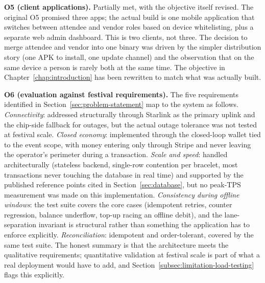 \textbf{O5 (client applications).} Partially met, with the objective itself revised. The original O5 promised three apps; the actual build is one mobile application that switches between attendee and vendor roles based on device whitelisting, plus a separate web admin dashboard. This is two clients, not three. The decision to merge attendee and vendor into one binary was driven by the simpler distribution story (one APK to install, one update channel) and the observation that on the same device a person is rarely both at the same time. The objective in Chapter~\ref{chap:introduction} has been rewritten to match what was actually built.

\textbf{O6 (evaluation against festival requirements).} The five requirements identified in Section~\ref{sec:problem-statement} map to the system as follows. \emph{Connectivity}: addressed structurally through Starlink as the primary uplink and the chip-side fallback for outages, but the actual outage tolerance was not tested at festival scale. \emph{Closed economy}: implemented through the closed-loop wallet tied to the event scope, with money entering only through Stripe and never leaving the operator's perimeter during a transaction. \emph{Scale and speed}: handled architecturally (stateless backend, single-row contention per bracelet, most transactions never touching the database in real time) and supported by the published reference points cited in Section~\ref{sec:database}, but no peak-TPS measurement was made on this implementation. \emph{Consistency during offline windows}: the test suite covers the core cases (idempotent retries, counter regression, balance underflow, top-up racing an offline debit), and the lane-separation invariant is structural rather than something the application has to enforce explicitly. \emph{Reconciliation}: idempotent and order-tolerant, covered by the same test suite. The honest summary is that the architecture meets the qualitative requirements; quantitative validation at festival scale is part of what a real deployment would have to add, and Section~\ref{subsec:limitation-load-testing} flags this explicitly.
